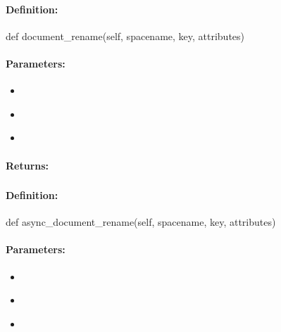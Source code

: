 \paragraph{Definition:}
\begin{pythoncode}
def document_rename(self, spacename, key, attributes)
\end{pythoncode}

\paragraph{Parameters:}
\begin{itemize}[noitemsep]
\item {}\\

\item {}\\

\item {}\\

\end{itemize}

\paragraph{Returns:}


\pagebreak
\subsubsection{}
\label{api:python:async_document_rename}


\paragraph{Definition:}
\begin{pythoncode}
def async_document_rename(self, spacename, key, attributes)
\end{pythoncode}

\paragraph{Parameters:}
\begin{itemize}[noitemsep]
\item {}\\

\item {}\\

\item {}\\

\end{itemize}

